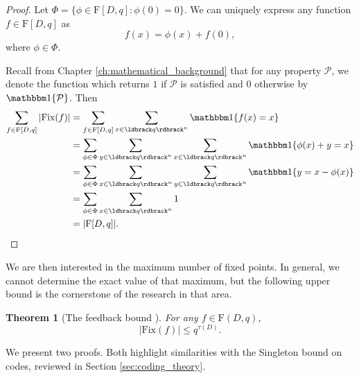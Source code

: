 \documentclass[a4paper, 11pt]{book}
\numberwithin{equation}{section}
\theoremstyle{plain}
\newtheorem{theorem}	[equation]	{Theorem}
\newcommand{\feedback}{\tau}
\newcommand{\functions}{\mathrm{F}}
\newcommand{\Fix}{\mathrm{Fix}}
\renewcommand{\(}{\ldbrack}
\renewcommand{\)}{\rdbrack}
\newcommand{\one}[1]{{\mathbbm 1}\{ #1 \}}
\begin{document}
\begin{proof}
Let $\Phi = \{ \phi \in \functions[D, q] : \phi(0) = 0 \}$. We can uniquely express any function $f \in \functions[D,q]$ as 
\[
	f(x) = \phi(x) + f(0),
\]
where $\phi \in \Phi$.

Recall from Chapter \ref{ch:mathematical_background} that for any property $\mathcal{P}$, we denote the function which returns $1$ if $\mathcal{P}$ is satisfied and $0$ otherwise by $\one{\mathcal{P}}$. Then
\begin{align*}
	\sum_{f \in \functions[D,q]} |\Fix(f)| &= \sum_{f \in \functions[D,q]} \sum_{x \in \(q\)^n} \one{ f(x) = x }\\
	&= \sum_{\phi \in \Phi} \sum_{y \in \(q\)^n} \sum_{x \in \(q\)^n} \one{ \phi(x) + y = x }\\
	&= \sum_{\phi \in \Phi} \sum_{x \in \(q\)^n} \sum_{y \in \(q\)^n} \one{ y = x - \phi(x) }\\
	&= \sum_{\phi \in \Phi} \sum_{x \in \(q\)^n} 1\\
	&= |\functions[D,q]|.
\end{align*}
\end{proof}



We are then interested in the maximum number of fixed points. In general, we cannot determine the exact value of that maximum, but the following upper bound is the cornerstone of the research in that area. %


\begin{theorem}[The feedback bound \cite{ADG04, Rii06}] \label{th:fixed_points_feedback}
For any $f \in \functions(D,q)$,
\[
	|\Fix(f)| \le q^{\feedback(D)}.
\]
\end{theorem}

We present two proofs. Both highlight similarities with the Singleton bound on codes, reviewed in Section \ref{sec:coding_theory}.
\end{document}
